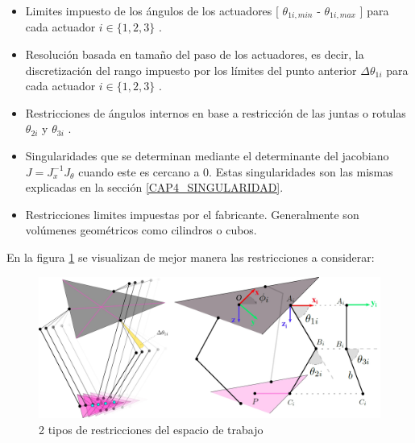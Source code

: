     \begin{itemize}
    	\item Limites impuesto de los ángulos de los actuadores [  \(  \theta _{1i,min} \)  -   \(  \theta _{1i,max} \)  ] para cada actuador  \( i \in \{ 1,2,3 \}  \)  .\par
    
    	\item Resolución basada en tamaño del paso de los actuadores, es decir, la discretización del rango impuesto por los límites del punto anterior  \(  \Delta  \theta _{1i} \)  para cada actuador  \( i \in \{ 1,2,3 \}  \) .\par
    
    	\item Restricciones de ángulos internos en base a restricción de las juntas o rotulas  \(  \theta _{2i} \)  y  \(  \theta _{3i} \) .\par
    
    	\item Singularidades que se determinan mediante el determinante del jacobiano  \( J=J_{x}^{-1}J_{ \theta } \)   cuando este es cercano a 0. Estas singularidades son las mismas explicadas en la sección \ref{CAP4_SINGULARIDAD}.
    	
    	\item Restricciones limites impuestas por el fabricante. Generalmente son volúmenes geométricos como cilindros o cubos.	
    	
    \end{itemize}
    
    
    En la figura \ref{f:Cap4_ws_2} se visualizan de mejor manera las restricciones a considerar:
    
    
    \begin{figure}[htb]
        \centering
        \includegraphics[width=1\linewidth]{Main/Chapter4/Images4/DIBUJO51.jpg}
        \caption{2 tipos de restricciones del espacio de trabajo}
        \label{f:Cap4_ws_2}
    \end{figure}   


